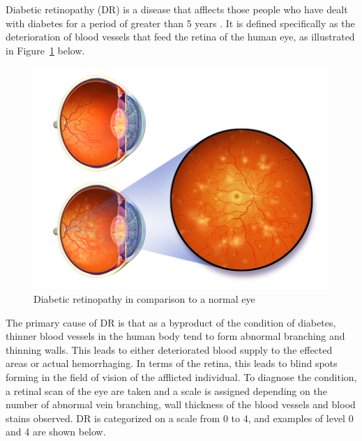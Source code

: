 \documentclass[letterpaper,12pt]{article}
\newcommand{\figref}[1]{Figure~\ref{#1}}
\begin{document}
Diabetic retinopathy (DR) is a disease that afflects those people who have dealt with diabetes for a period of greater than 5 years \cite{nih}. It is defined specifically as the deterioration of blood vessels that feed the retina of the human eye, as illustrated in \figref{eye} below.
\begin{figure}[htbp]
\begin{center}
\includegraphics[scale=0.6]{images/illustration.png}
\caption{Diabetic retinopathy in comparison to a normal eye \cite{wiki}}
\label{eye}
\end{center}
\end{figure}
The primary cause of DR is that as a byproduct of the condition of diabetes, thinner blood vessels in the human body tend to form abnormal branching and thinning walls. This leads to either deteriorated blood supply to the effected areas or actual hemorrhaging. In terms of the retina, this leads to blind spots forming in the field of vision of the afflicted individual. 
To diagnose the condition, a retinal scan of the eye are taken and a scale is assigned depending on the number of abnormal vein branching, wall thickness of the blood vessels and blood stains observed. DR is categorized on a scale from 0 to 4, and examples of level 0 and 4 are shown below.
\end{document}
